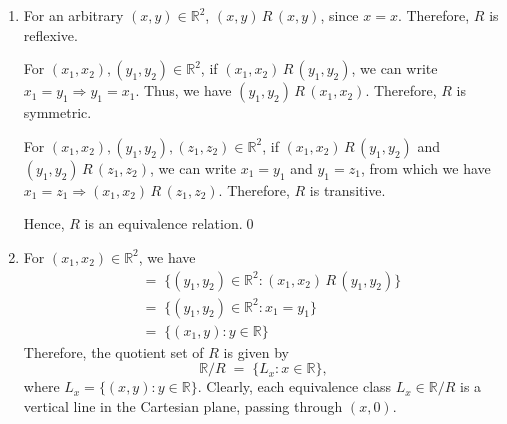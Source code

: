 \documentclass[10pt]{article}
\begin{document}
        \begin{enumerate}
                \item For an arbitrary $(x, y)\in\mathbb{R}^2$, $(x, y)\,R\,(x, y)$, since $x = x$. Therefore, $R$ is reflexive.

                For $(x_1, x_2), (y_1, y_2) \in \mathbb{R}^2$, if $(x_1, x_2)\,R\,(y_1, y_2)$, we can write $x_1 = y_1 \Rightarrow y_1 = x_1$.
                Thus, we have $(y_1, y_2)\,R\,(x_1, x_2)$. Therefore, $R$ is symmetric.

                For $(x_1, x_2), (y_1, y_2), (z_1, z_2) \in \mathbb{R}^2$, if $(x_1, x_2)\,R\,(y_1, y_2)$ and $(y_1, y_2)\,R\,(z_1, z_2)$,
                we can write $x_1 = y_1$ and $y_1 = z_1$, from which we have $x_1 = z_1 \Rightarrow (x_1, x_2)\,R\,(z_1, z_2)$.
                Therefore, $R$ is transitive.

                Hence, $R$ is an equivalence relation.\qed

                \item For $(x_1, x_2) \in \mathbb{R}^2$, we have
                \begin{align*}
                [(x_1, x_2)] \;&=\; \{(y_1, y_2) \in \mathbb{R}^2 : (x_1, x_2)\,R\,(y_1, y_2)\} \\
                        \;&=\; \{(y_1, y_2) \in \mathbb{R}^2 : x_1 = y_1\}\\
                        \;&=\; \{(x_1, y) : y \in \mathbb{R}\}
                \end{align*}
                Therefore, the quotient set of $R$ is given by $$\mathbb{R}/R \;=\; \{L_x : x \in \mathbb{R}\},$$
                where $L_x = \{(x, y) : y \in \mathbb{R}\}$.
                Clearly, each equivalence class $L_x \in \mathbb{R}/R$ is a vertical line in the Cartesian plane, passing through $(x, 0)$.\\

                \begin{center}
                \end{center}
        \end{enumerate}
        \clearpage
\end{document}
